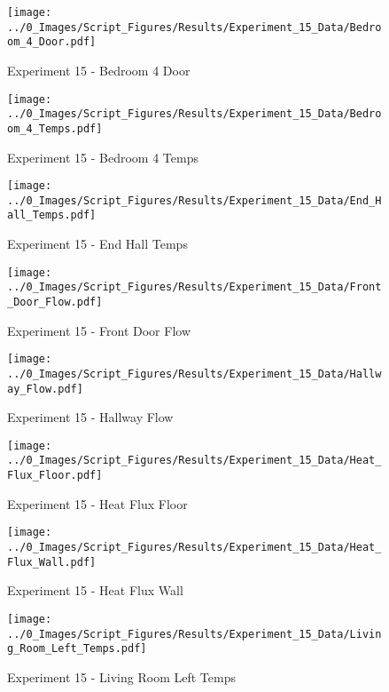 	\clearpage

	\begin{figure}[H]
		\centering
		\texttt{[image: ../0\_Images/Script\_Figures/Results/Experiment\_15\_Data/Bedroom\_4\_Door.pdf]}
		\caption[]{Experiment 15 - Bedroom 4 Door}
	\end{figure}
 

	\begin{figure}[H]
		\centering
		\texttt{[image: ../0\_Images/Script\_Figures/Results/Experiment\_15\_Data/Bedroom\_4\_Temps.pdf]}
		\caption[]{Experiment 15 - Bedroom 4 Temps}
	\end{figure}
 
	\clearpage

	\begin{figure}[H]
		\centering
		\texttt{[image: ../0\_Images/Script\_Figures/Results/Experiment\_15\_Data/End\_Hall\_Temps.pdf]}
		\caption[]{Experiment 15 - End Hall Temps}
	\end{figure}
 

	\begin{figure}[H]
		\centering
		\texttt{[image: ../0\_Images/Script\_Figures/Results/Experiment\_15\_Data/Front\_Door\_Flow.pdf]}
		\caption[]{Experiment 15 - Front Door Flow}
	\end{figure}
 
	\clearpage

	\begin{figure}[H]
		\centering
		\texttt{[image: ../0\_Images/Script\_Figures/Results/Experiment\_15\_Data/Hallway\_Flow.pdf]}
		\caption[]{Experiment 15 - Hallway Flow}
	\end{figure}
 

	\begin{figure}[H]
		\centering
		\texttt{[image: ../0\_Images/Script\_Figures/Results/Experiment\_15\_Data/Heat\_Flux\_Floor.pdf]}
		\caption[]{Experiment 15 - Heat Flux Floor}
	\end{figure}
 
	\clearpage

	\begin{figure}[H]
		\centering
		\texttt{[image: ../0\_Images/Script\_Figures/Results/Experiment\_15\_Data/Heat\_Flux\_Wall.pdf]}
		\caption[]{Experiment 15 - Heat Flux Wall}
	\end{figure}
 

	\begin{figure}[H]
		\centering
		\texttt{[image: ../0\_Images/Script\_Figures/Results/Experiment\_15\_Data/Living\_Room\_Left\_Temps.pdf]}
		\caption[]{Experiment 15 - Living Room Left Temps}
	\end{figure}
 
